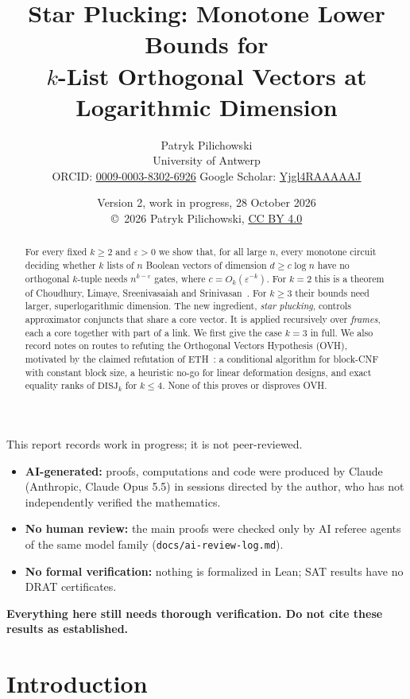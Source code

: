 \documentclass[11pt,a4paper]{article}
\title{\textbf{Star Plucking: Monotone Lower Bounds for\\$k$-List Orthogonal Vectors at Logarithmic Dimension}}
\author{Patryk Pilichowski\\
\small University of Antwerp\\
\small ORCID: \href{https://orcid.org/0009-0003-8302-6926}{0009-0003-8302-6926}\quad
Google Scholar: \href{https://scholar.google.com/citations?user=Yjgl4RAAAAAJ}{Yjgl4RAAAAAJ}}
\date{Version 2, work in progress, 28 October 2026\\
\small\copyright\ 2026 Patryk Pilichowski, \href{https://creativecommons.org/licenses/by/4.0/}{CC BY 4.0}}
\theoremstyle{plain}
\theoremstyle{definition}
\theoremstyle{remark}
\newcommand{\DISJ}{\mathrm{DISJ}}
\newcommand{\code}[1]{\texttt{\small #1}}
\begin{document}
\maketitle

\begin{disclaimer}
\small
This report records work in progress; it is not peer-reviewed.
\begin{itemize}[leftmargin=12pt]
  \item \textbf{AI-generated:} proofs, computations and code were produced by Claude (Anthropic, Claude Opus 5.5)
    in sessions directed by the author, who has not independently verified the mathematics.
  \item \textbf{No human review:} the main proofs were checked only by AI referee agents of the same model family
    (\code{docs/ai-review-log.md}).
  \item \textbf{No formal verification:} nothing is formalized in Lean; SAT results have no DRAT certificates.
\end{itemize}
\textbf{Everything here still needs thorough verification. Do not cite these results as established.}
\end{disclaimer}

\begin{abstract}
For every fixed $k\ge2$ and $\varepsilon>0$ we show that, for all large $n$, every monotone circuit deciding
whether $k$ lists of $n$ Boolean vectors of dimension $d\ge c\log n$ have no orthogonal $k$-tuple needs
$n^{k-\varepsilon}$ gates, where $c=O_k(\varepsilon^{-k})$. For $k=2$ this is a theorem of Choudhury, Limaye,
Sreenivasaiah and Srinivasan~\cite{CLSS26}. For $k\ge3$ their bounds need larger, superlogarithmic dimension. The new
ingredient, \emph{star plucking}, controls approximator conjuncts that share a core vector. It is applied recursively
over \emph{frames}, each a core together with part of a link. We first give the case $k=3$ in full. We also record
notes on routes to refuting the Orthogonal Vectors Hypothesis (OVH), motivated by the claimed refutation of
ETH~\cite{OpenAI26,Anthropic26}: a conditional algorithm for block-CNF with constant block size, a heuristic no-go
for linear deformation designs, and exact equality ranks of $\DISJ_k$ for $k\le4$. None of this proves or disproves
OVH.
\end{abstract}

\section{Introduction}
\end{document}
